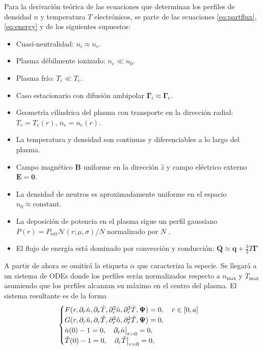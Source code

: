 Para la derivación teórica de las ecuaciones que determinan los perfiles de densidad $n$ y temperatura $T$ electrónicos, se parte de las ecuaciones \eqref{eq:partflux}, \eqref{eq:energy} y de los siguientes supuestos:
\begin{itemize}[noitemsep]
\item Cuasi-neutralidad: $n_i \approx n_e$.
\item Plasma débilmente ionizado: $n_e \ll n_0$.
\item Plasma frío: $T_i \ll T_e$.
\item Caso estacionario con difusión ambipolar $\bm{\Gamma}_i \approx \bm{\Gamma}_e$.
\item Geometría cilíndrica del plasma con transporte en la dirección radial: $T_e = T_e(r)$, $n_e = n_e(r)$.
\item La temperatura y densidad son continuas y diferenciables a lo largo del plasma.
\item Campo magnético $\bm{B}$ uniforme en la dirección $\hat{z}$ y campo eléctrico externo $\bm{E} = \bm{0}$.
\item La densidad de neutros es aproximadamente uniforme en el espacio $n_0 \approx \text{constant}$.
\item La deposición de potencia en el plasma sigue un perfil gaussiano $P(r) = P_\text{ext} \mathcal{N}(r; \mu, \sigma) / N$ normalizado por $N$ . 
\item El flujo de energía está dominado por convección y conducción: $\bm{Q} \approx \bm{q} + \frac{3}{2}T\bm{\Gamma}$
\end{itemize}
A partir de ahora se omitirá la etiqueta $\alpha$ que caracteriza la especie. Se llegará a un sistema de ODEs donde los perfiles serán normalizados respecto a $n_\text{max}$ y $T_\text{max}$ asumiendo que los perfiles alcanzan su máximo en el centro del plasma. El sistema resultante es de la forma
\begin{equation}\label{eq:odesys}
	\begin{cases}
		F(r, \partial_r \hat{n}, \partial_r \hat{T}, \partial_r^2 \hat{n}, \partial_r^2\hat{T}, \bm{\Psi}) = 0, \quad r \in [0, a]\\
		G(r, \partial_r \hat{n}, \partial_r \hat{T}, \partial_r^2 \hat{n}, \partial_r^2\hat{T}, \bm{\Psi}) = 0, \\
		\hat{n}(0) - 1 = 0, \quad \partial_r \hat{n}\big{|}_{r = 0} = 0, \\
		\hat{T}(0) - 1 = 0, \quad \partial_r \hat{T}\big{|}_{r = 0} = 0,\\
	\end{cases}
\end{equation}

